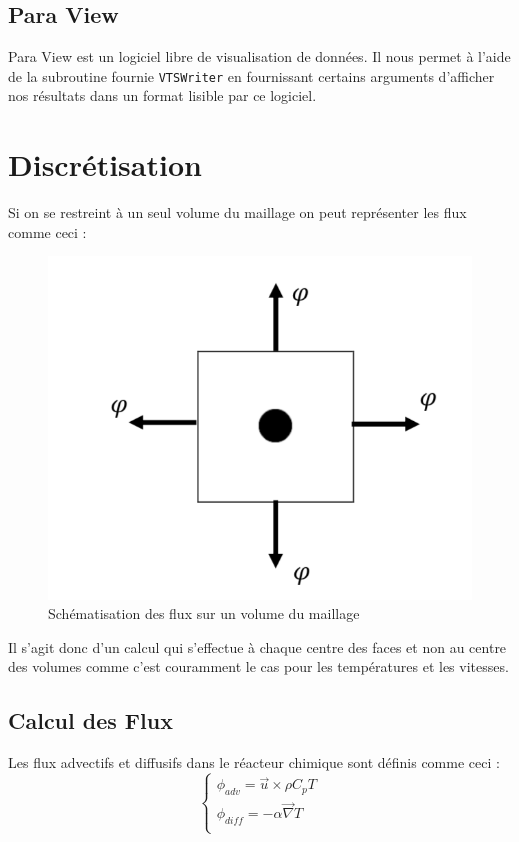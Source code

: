 \documentclass[a4paper,oneside]{article}
\makeatletter
\def\bigcenter{\trivlist \bigcentering\item\relax}
\def\bigcentering{\let\\\@centercr\rightskip\@bigflushglue%
\leftskip\@bigflushglue
\parindent\z@\parfillskip\z@skip}
\makeatother
\begin{document}
\subsection{Para View}

Para View est un logiciel libre de visualisation de données. 
Il nous permet à l'aide de la subroutine fournie \verb?VTSWriter? en fournissant certains arguments d'afficher nos résultats dans un format lisible par ce logiciel.

\section{Discrétisation}
Si on se restreint à un seul volume du maillage on peut représenter les flux comme ceci :

\begin{figure}[h!]
\bigcenter
\includegraphics[scale=0.4]{flux.PNG}
\caption{Schématisation des flux sur un volume du maillage}
\end{figure}


Il s'agit donc d'un calcul qui s'effectue à chaque centre des faces et non au centre des volumes comme c'est couramment le cas pour les températures et les vitesses.


\subsection{Calcul des Flux}


Les flux advectifs et diffusifs dans le réacteur chimique sont définis comme ceci :
\begin{equation*}
\begin{cases}
\phi_{adv} = \overrightarrow{u}\times \rho C_p T\\
\phi_{diff} = -\alpha \overrightarrow{\nabla} T\\
\end{cases}
\end{equation*}
\end{document}
